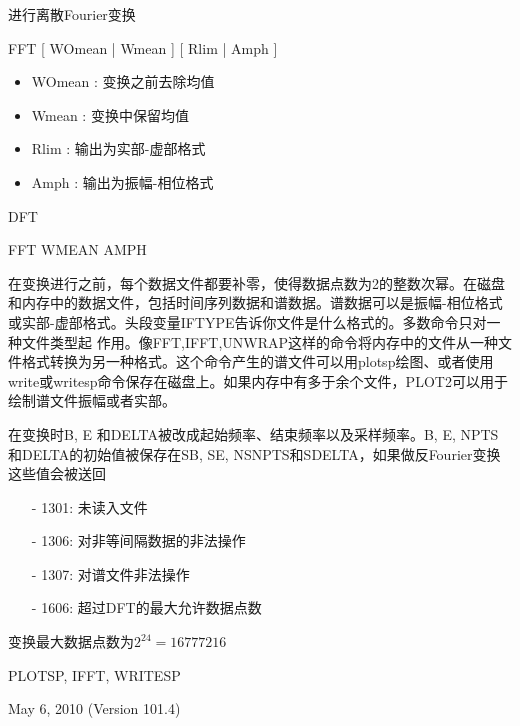 \label{cmd:fft}

进行离散Fourier变换

FFT [ WOmean | Wmean ] [ Rlim | Amph ]

\begin{itemize}
\item WOmean :  变换之前去除均值 
\item Wmean : 变换中保留均值 
\item Rlim : 输出为实部-虚部格式
\item Amph : 输出为振幅-相位格式
\end{itemize}

DFT

FFT WMEAN AMPH

在变换进行之前，每个数据文件都要补零，使得数据点数为2的整数次幂。在磁盘和内存中的数据文件，包括时间序列数据和谱数据。谱数据可以是振幅-相位格式或实部-虚部格式。头段变量IFTYPE告诉你文件是什么格式的。多数命令只对一种文件类型起	作用。像FFT,IFFT,UNWRAP这样的命令将内存中的文件从一种文件格式转换为另一种格式。这个命令产生的谱文件可以用plotsp绘图、或者使用write或writesp命令保存在磁盘上。如果内存中有多于余个文件，PLOT2可以用于绘制谱文件振幅或者实部。

在变换时B, E 和DELTA被改成起始频率、结束频率以及采样频率。B, E, NPTS和DELTA的初始值被保存在SB, SE, NSNPTS和SDELTA，如果做反Fourier变换这些值会被送回

\begin{itemize}
\item[-]1301: 未读入文件
\item[-]1306: 对非等间隔数据的非法操作
\item[-]1307: 对谱文件非法操作
\item[-]1606: 超过DFT的最大允许数据点数
\end{itemize}

变换最大数据点数为$2^{24}=16777216$

PLOTSP, IFFT, WRITESP

May 6, 2010 (Version 101.4)
